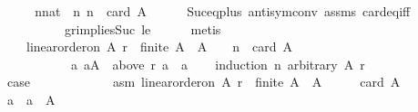 \begin{isabellebody}
\ {\isacharminus}{\kern0pt}\isanewline
\ \ \isamarkupfalse%
\ n{\isacharcolon}{\kern0pt}{\isacharcolon}{\kern0pt}nat\ \ n{\isacharcolon}{\kern0pt}\ {\isachardoublequoteopen}n{\isacharplus}{\kern0pt}{}\ {\isacharequal}{\kern0pt}\ card\ A{\isachardoublequoteclose}\isanewline
\ \ \ \ \isamarkupfalse%
\ Suc{\isacharunderscore}{\kern0pt}eq{\isacharunderscore}{\kern0pt}plus{}\ antisym{\isacharunderscore}{\kern0pt}conv{}\ assms{\isacharparenleft}{\kern0pt}{}{\isacharparenright}{\kern0pt}\ card{\isacharunderscore}{\kern0pt}eq{\isacharunderscore}{\kern0pt}{}{\isacharunderscore}{\kern0pt}iff\isanewline
\ \ \ \ \ \ \ \ \ \ gr{}{\isacharunderscore}{\kern0pt}implies{\isacharunderscore}{\kern0pt}Suc\ le{}\isanewline
\ \ \ \ \isamarkupfalse%
\ metis\isanewline
\ \ \isamarkupfalse%
\isanewline
\ \ \ \ {\isachardoublequoteopen}{\isacharparenleft}{\kern0pt}linear{\isacharunderscore}{\kern0pt}order{\isacharunderscore}{\kern0pt}on\ A\ r\ {\isasymand}\ finite\ A\ {\isasymand}\ A\ {\isasymnoteq}\ {\isacharbraceleft}{\kern0pt}{\isacharbraceright}{\kern0pt}\ {\isasymand}\ n{\isacharplus}{\kern0pt}{}\ {\isacharequal}{\kern0pt}\ card\ A{\isacharparenright}{\kern0pt}\isanewline
\ \ \ \ \ \ \ \ \ \ {\isasymlongrightarrow}\ {\isacharparenleft}{\kern0pt}{\isasymexists}a{\isachardot}{\kern0pt}\ a{\isasymin}A\ {\isasymand}\ above\ r\ a\ {\isacharequal}{\kern0pt}\ {\isacharbraceleft}{\kern0pt}a{\isacharbraceright}{\kern0pt}{\isacharparenright}{\kern0pt}{\isachardoublequoteclose}\isanewline
\ \ \isamarkupfalse%
\ {\isacharparenleft}{\kern0pt}induction\ n\ arbitrary{\isacharcolon}{\kern0pt}\ A\ r{\isacharparenright}{\kern0pt}\isanewline
\ \ \ \ \isamarkupfalse%
\ {}\isanewline
\ \ \ \ \isamarkupfalse%
\ {\isacharquery}{\kern0pt}case\isanewline
\ \ \ \ \isamarkupfalse%
\isanewline
\ \ \ \ \ \ \isamarkupfalse%
\ asm{\isacharcolon}{\kern0pt}\ {\isachardoublequoteopen}linear{\isacharunderscore}{\kern0pt}order{\isacharunderscore}{\kern0pt}on\ A\ r\ {\isasymand}\ finite\ A\ {\isasymand}\ A\ {\isasymnoteq}\ {\isacharbraceleft}{\kern0pt}{\isacharbraceright}{\kern0pt}\ {\isasymand}\ {}{\isacharplus}{\kern0pt}{}\ {\isacharequal}{\kern0pt}\ card\ A{\isachardoublequoteclose}\isanewline
\ \ \ \ \ \ \isamarkupfalse%
\ \isamarkupfalse%
\ a\ \ {\isachardoublequoteopen}{\isacharbraceleft}{\kern0pt}a{\isacharbraceright}{\kern0pt}\ {\isacharequal}{\kern0pt}\ A{\isachardoublequoteclose}\isanewline

\end{isabellebody}

